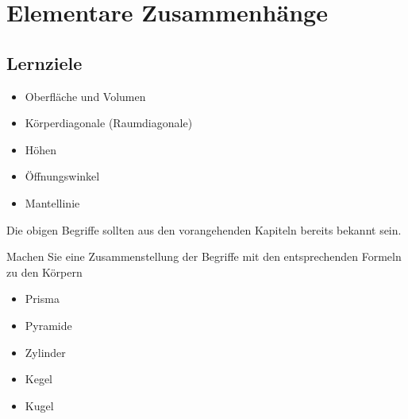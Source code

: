 \section{Elementare Zusammenhänge}
\sectuntertitel{}


\subsection*{Lernziele}
\begin{itemize}
\item Oberfläche und Volumen
\item Körperdiagonale (Raumdiagonale)
\item Höhen
\item Öffnungswinkel
\item Mantellinie
\end{itemize}

Die obigen Begriffe sollten aus den vorangehenden Kapiteln bereits
bekannt sein.

Machen Sie eine Zusammenstellung der Begriffe mit den entsprechenden
Formeln zu den Körpern
\begin{itemize}
\item Prisma
\item Pyramide
\item Zylinder
\item Kegel
\item Kugel
\end{itemize}

\newpage
